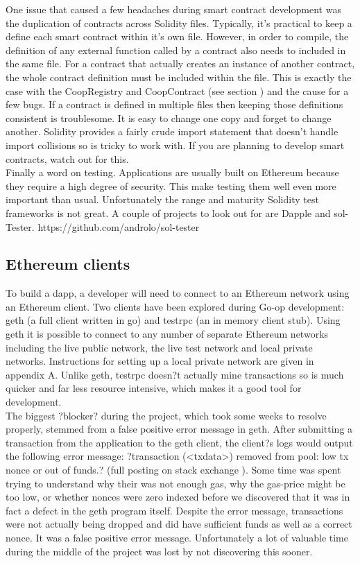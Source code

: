 One issue that caused a few headaches during smart contract development was the duplication of contracts across Solidity files. Typically, it's practical to keep a define each smart contract within it's own file. However, in order to compile, the definition of any external function called by a contract also needs to included in the same file. For a contract that actually creates an instance of another contract, the whole contract definition must be included within the file. This is exactly the case with the CoopRegistry and CoopContract (see section ) and the cause for a few bugs. If a contract is defined in multiple files then keeping those definitions consistent is troublesome. It is easy to change one copy and forget to change another. Solidity provides a fairly crude import statement that doesn't handle import collisions so is tricky to work with. If you are planning to develop smart contracts, watch out for this.\\

Finally a word on testing. Applications are usually built on Ethereum because they require a high degree of security. This make testing them well even more important than usual. Unfortunately the range and maturity Solidity test frameworks is not great. A couple of projects to look out for are Dapple and sol-Tester. https://github.com/androlo/sol-tester \\


\subsection{Ethereum clients}
To build a dapp, a developer will need to connect to an Ethereum network using an Ethereum client. Two clients have been explored during Go-op development: geth (a full client written in go) and testrpc (an in memory client stub). Using geth it is possible to connect to any number of separate Ethereum networks including the live public network, the live test network and local private networks. Instructions for setting up a local private network are given in appendix A. Unlike geth, testrpc doesn?t actually mine transactions so is much quicker and far less resource intensive, which makes it a good tool for development.\\

The biggest ?blocker? during the project, which took some weeks to resolve properly, stemmed from a false positive error message in geth. After submitting a transaction from the application to the geth client, the client?s logs would output the following error message: ?transaction (<txdata>) removed from pool: low tx nonce or out of funds.? (full posting on stack exchange \cite{GethStackExchange}). Some time was spent trying to understand why their was not enough gas, why the gas-price might be too low, or whether nonces were zero indexed before we discovered that it was in fact a defect in the geth program itself\cite{GethBug}. Despite the error message, transactions were not actually being dropped and did have sufficient funds as well as a correct nonce. It was a false positive error message. Unfortunately a lot of valuable time during the middle of the project was lost by not discovering this sooner. \\

